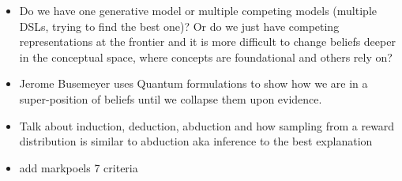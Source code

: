 \begin{itemize}
    \item Do we have one generative model or multiple competing models (multiple DSLs, trying to find the best one)? Or do we just have competing representations at the frontier and it is more difficult to change beliefs deeper in the conceptual space, where concepts are foundational and others rely on?
    \item Jerome Busemeyer uses Quantum formulations to show how we are in a super-position of beliefs until we collapse them upon evidence. 
\end{itemize}




\begin{itemize}
    \item Talk about induction, deduction, abduction and how sampling from a reward distribution is similar to abduction aka inference to the best explanation
    \item add markpoels 7 criteria 
\end{itemize}























